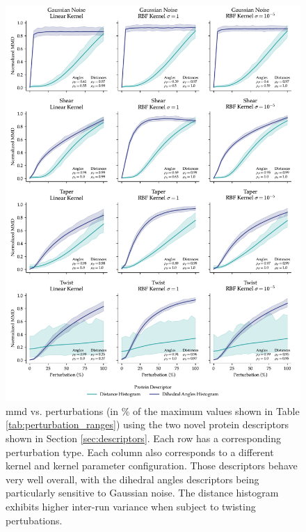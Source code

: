 \begin{figure}[htpb!]
  \includegraphics[width=\textwidth]{./figures/results/res_4.pdf}
  \caption[\acrshort{mmd} vs. perturbations using the two novel protein
descriptors.]{\acrshort{mmd} vs. perturbations (in \% of the maximum values
shown in Table \ref{tab:perturbation_ranges}) using the two novel protein
descriptors shown in Section \ref{sec:descriptors}. Each row has a corresponding
perturbation type. Each column also corresponds to a different kernel and kernel
parameter configuration. Those descriptors behave very well overall, with the
dihedral angles descriptors being particularly sensitive to Gaussian noise. The
distance histogram exhibits higher inter-run variance when subject to twisting
pertubations.}
  \label{fig:protein_specific_descriptors}
\end{figure}



